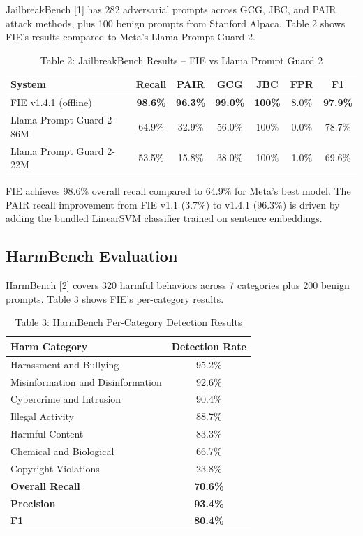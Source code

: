 \documentclass[12pt,a4paper]{article}
\begin{document}
JailbreakBench [1] has 282 adversarial prompts across GCG, JBC, and PAIR
attack methods, plus 100 benign prompts from Stanford Alpaca. Table 2 shows
FIE's results compared to Meta's Llama Prompt Guard 2.

\begin{table}[H]
\centering
\caption{Table 2: JailbreakBench Results -- FIE vs Llama Prompt Guard 2}
\vspace{4pt}
\begin{tabular}{lcccccc}
\toprule
\textbf{System} & \textbf{Recall} & \textbf{PAIR} & \textbf{GCG} & \textbf{JBC} & \textbf{FPR} & \textbf{F1} \\
\midrule
FIE v1.4.1 (offline) & \textbf{98.6\%} & \textbf{96.3\%} & \textbf{99.0\%} & \textbf{100\%} & 8.0\% & \textbf{97.9\%} \\
Llama Prompt Guard 2-86M & 64.9\% & 32.9\% & 56.0\% & 100\% & 0.0\% & 78.7\% \\
Llama Prompt Guard 2-22M & 53.5\% & 15.8\% & 38.0\% & 100\% & 1.0\% & 69.6\% \\
\bottomrule
\end{tabular}
\end{table}

FIE achieves 98.6\% overall recall compared to 64.9\% for Meta's best model.
The PAIR recall improvement from FIE v1.1 (3.7\%) to v1.4.1 (96.3\%) is
driven by adding the bundled LinearSVM classifier trained on sentence embeddings.

\subsection{HarmBench Evaluation}

HarmBench [2] covers 320 harmful behaviors across 7 categories plus 200
benign prompts. Table 3 shows FIE's per-category results.

\begin{table}[H]
\centering
\caption{Table 3: HarmBench Per-Category Detection Results}
\vspace{4pt}
\begin{tabular}{lc}
\toprule
\textbf{Harm Category} & \textbf{Detection Rate} \\
\midrule
Harassment and Bullying & 95.2\% \\
Misinformation and Disinformation & 92.6\% \\
Cybercrime and Intrusion & 90.4\% \\
Illegal Activity & 88.7\% \\
Harmful Content & 83.3\% \\
Chemical and Biological & 66.7\% \\
Copyright Violations & 23.8\% \\
\midrule
\textbf{Overall Recall} & \textbf{70.6\%} \\
\textbf{Precision} & \textbf{93.4\%} \\
\textbf{F1} & \textbf{80.4\%} \\
\bottomrule
\end{tabular}
\end{table}
\end{document}
